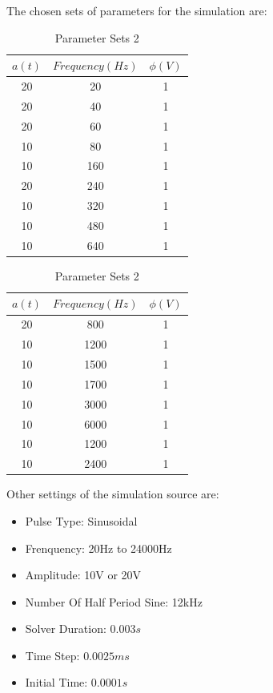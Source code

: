 \documentclass[letterpaper,12pt]{article}
\begin{document}
\noindent The chosen sets of parameters for the simulation are:
\begin{table}[H]
    \centering
    \scriptsize
    \begin{minipage}[t]{0.45\textwidth}
    \centering
    \begin{tabular}{|c|c|c|}
    \toprule
    \textbf{$a(t)$} & \textbf{$Frequency (Hz)$} & \textbf{$\phi (V)$} \\
    \midrule
    20 & 20   & 1 \\
    20 & 40   & 1 \\
    20 & 60   & 1 \\
    10 & 80   & 1 \\
    10 & 160  & 1 \\
    20 & 240  & 1 \\
    10 & 320  & 1 \\
    10 & 480  & 1 \\
    10 & 640  & 1 \\
    \bottomrule
    \end{tabular}
    \caption{Parameter Sets 1}
    \end{minipage}\hfill
    \begin{minipage}[t]{0.45\textwidth}
    \centering
    \begin{tabular}{|c|c|c|}
    \toprule
    \textbf{$a(t)$} & \textbf{$Frequency (Hz)$} & \textbf{$\phi (V)$} \\
    \midrule
    20 & 800  & 1 \\
    10 & 1200 & 1 \\
    10 & 1500 & 1 \\
    10 & 1700 & 1 \\
    10 & 3000 & 1 \\
    10 & 6000 & 1 \\
    10 & 1200 & 1 \\
    10 & 2400 & 1 \\
    \bottomrule
    \end{tabular}
    \caption{Parameter Sets 2}
    \end{minipage}
\end{table}
\noindent Other settings of the simulation source are:
\begin{multicols}{2}
\begin{itemize}
    \item Pulse Type: Sinusoidal
    \item Frenquency: 20Hz to 24000Hz
    \item Amplitude: 10V or 20V
    \item Number Of Half Period Sine: 12kHz
    \item Solver Duration: $0.003s$
    \item Time Step: $0.0025ms$
    \item Initial Time: $0.0001s$
\end{itemize}
\end{multicols}
\end{document}
